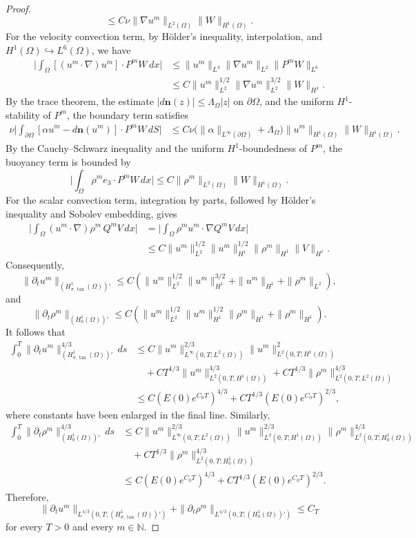 \documentclass[11pt,reqno]{amsart}
\theoremstyle{plain}
\numberwithin{equation}{section}
\begin{document}
\begin{proof}
\[\le C\nu\|\nabla u^m\|_{L^2(\Omega)}\|W\|_{H^1(\Omega)}.
\]
For the velocity convection term, by
H\"older's inequality, interpolation, and
$H^1(\Omega)\hookrightarrow L^6(\Omega)$,
we have
\begin{align*}
\bigg|\int_\Omega[(u^m\cdot\nabla)u^m]\cdot P^mW\,dx\bigg|
&\le \|u^m\|_{L^3}\|\nabla u^m\|_{L^2}\|P^mW\|_{L^6}\\
&\le C\|u^m\|_{L^2}^{1/2}\|\nabla u^m\|_{L^2}^{3/2}\|W\|_{H^1}.
\end{align*}
By the trace theorem, the estimate
$|d\boldsymbol n(z)|\le\Lambda_\Omega|z|$ on $\partial\Omega$, and the uniform
$H^1$-stability of $P^m$, the boundary term satisfies
\begin{align*}
\nu\bigg|\int_{\partial\Omega}[\alpha u^m-d\boldsymbol n(u^m)]\cdot P^mW\,dS\bigg|
&\le C\nu\bigl(\|\alpha\|_{L^\infty(\partial\Omega)}+\Lambda_\Omega\bigr)
\|u^m\|_{H^1(\Omega)}\|W\|_{H^1(\Omega)}.
\end{align*}
By the Cauchy--Schwarz inequality and the uniform
\(H^1\)-boundedness of \(P^m\), the buoyancy term is bounded by
\[
\bigg|\int_\Omega\rho^m e_3\cdot P^mW\,dx\bigg|
\le C\|\rho^m\|_{L^2(\Omega)}\|W\|_{H^1(\Omega)}.
\]
For the scalar convection term, integration by parts, followed by H\"older's
inequality and Sobolev embedding, gives
\begin{align*}
\bigg|\int_\Omega (u^m\cdot\nabla)\rho^m\,Q^mV\,dx\bigg|
&=\bigg|\int_\Omega \rho^m u^m\cdot\nabla Q^mV\,dx\bigg|\\
&\le C\|u^m\|_{L^2}^{1/2}\|u^m\|_{H^1}^{1/2}
\|\rho^m\|_{H^1}\|V\|_{H^1}.
\end{align*}
Consequently,
\[
\|\partial_tu^m\|_{(H^1_{\sigma,\tan}(\Omega))'}
\le C\left(
\|u^m\|_{L^2}^{1/2}\|u^m\|_{H^1}^{3/2}
+\|u^m\|_{H^1}+\|\rho^m\|_{L^2}
\right),
\]
and
\[
\|\partial_t\rho^m\|_{(H^1_0(\Omega))'}
\le C\left(
\|u^m\|_{L^2}^{1/2}\|u^m\|_{H^1}^{1/2}\|\rho^m\|_{H^1}
+\|\rho^m\|_{H^1}
\right).
\]
It follows that
\begin{align*}
\int_0^T\|\partial_tu^m\|_{(H^1_{\sigma,\tan}(\Omega))'}^{4/3}\,ds
&\le C\|u^m\|_{L^\infty(0,T;L^2(\Omega))}^{2/3}
       \|u^m\|_{L^2(0,T;H^1(\Omega))}^2\\
&\quad+CT^{1/3}\|u^m\|_{L^2(0,T;H^1(\Omega))}^{4/3}
      +CT^{1/3}\|\rho^m\|_{L^2(0,T;L^2(\Omega))}^{4/3}\\
&\le C(E(0)e^{C_0T})^{4/3}
  +CT^{1/3}(E(0)e^{C_0T})^{2/3},
\end{align*}
where constants have been enlarged in the final line. Similarly,
\begin{align*}
\int_0^T\|\partial_t\rho^m\|_{(H^1_0(\Omega))'}^{4/3}\,ds
&\le C\|u^m\|_{L^\infty(0,T;L^2(\Omega))}^{2/3}
       \|u^m\|_{L^2(0,T;H^1(\Omega))}^{2/3}
       \|\rho^m\|_{L^2(0,T;H^1_0(\Omega))}^{4/3}\\
&\quad+CT^{1/3}\|\rho^m\|_{L^2(0,T;H^1_0(\Omega))}^{4/3}\\
&\le C(E(0)e^{C_0T})^{4/3}
  +CT^{1/3}(E(0)e^{C_0T})^{2/3}.
\end{align*}
Therefore,
\[
\|\partial_t u^m\|_{L^{4/3}(0,T;(H^1_{\sigma,\tan}(\Omega))')}
+\|\partial_t\rho^m\|_{L^{4/3}(0,T;(H^1_0(\Omega))')}
\le C_T
\]
for every $T>0$ and every $m\in\mathbb{N}$.


\end{proof}
\end{document}
